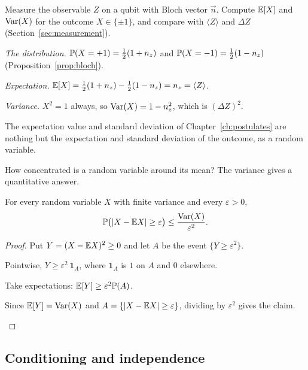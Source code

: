 \begin{example}\label{ex:rv-qm}
  Measure the observable $Z$ on a qubit with Bloch vector $\vec n$. Compute $\mathbb{E}[X]$ and $\operatorname{Var}(X)$ for the outcome $X\in\{\pm1\}$, and compare with $\langle Z\rangle$ and $\Delta Z$ (Section~\ref{sec:measurement}).
\end{example}
\begin{solution}
  \begin{steps}
    \item \emph{The distribution.} $\mathbb{P}(X=+1)=\tfrac12(1+n_z)$ and $\mathbb{P}(X=-1)=\tfrac12(1-n_z)$ (Proposition~\ref{prop:bloch}).
    \item \emph{Expectation.} $\mathbb{E}[X]=\tfrac12(1+n_z)-\tfrac12(1-n_z)=n_z=\langle Z\rangle$.
    \item \emph{Variance.} $X^2=1$ always, so $\operatorname{Var}(X)=1-n_z^2$, which is $(\Delta Z)^2$.
  \end{steps}
  The expectation value and standard deviation of Chapter~\ref{ch:postulates} are nothing but the expectation and standard deviation of the outcome, as a random variable.
\end{solution}

How concentrated is a random variable around its mean? The variance gives a quantitative answer.

\begin{theorem}\label{thm:chebyshev}
  For every random variable $X$ with finite variance and every $\varepsilon>0$,
  \[
    \mathbb{P}\bigl(\left|X-\mathbb{E} X\right|\ge\varepsilon\bigr)\le\frac{\operatorname{Var}(X)}{\varepsilon^2}.
  \]
\end{theorem}
\begin{proof}
  Put $Y=(X-\mathbb{E} X)^2\ge0$ and let $A$ be the event $\{Y\ge\varepsilon^2\}$.
  \begin{steps}
    \item Pointwise, $Y\ge\varepsilon^2\,\mathbf 1_A$, where $\mathbf 1_A$ is $1$ on $A$ and $0$ elsewhere.
    \item Take expectations: $\mathbb{E}[Y]\ge\varepsilon^2\mathbb{P}(A)$.
    \item Since $\mathbb{E}[Y]=\operatorname{Var}(X)$ and $A=\{\left|X-\mathbb{E} X\right|\ge\varepsilon\}$, dividing by $\varepsilon^2$ gives the claim. \qedhere
  \end{steps}
\end{proof}

\subsection{Conditioning and independence}

